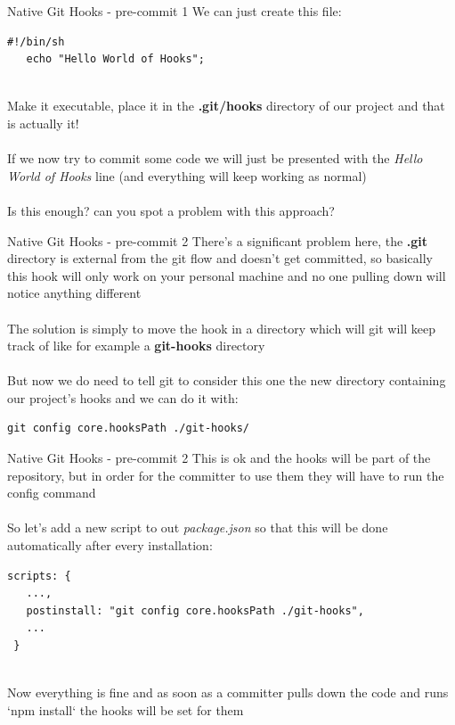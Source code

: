 \documentclass[11pt]{beamer}
\begin{document}
\begin{frame}[fragile]{Native Git Hooks - pre-commit 1}
  We can just create this file:
    \begin{lstlisting}[frame=single,columns=fullflexible]
   #!/bin/sh
   echo "Hello World of Hooks";
   \end{lstlisting}
  ~\\
  Make it executable, place it in the \textbf{.git/hooks} directory of our project and that is actually it!
  \\~\\
  If we now try to commit some code we will just be presented with the \textit{Hello World of Hooks} line (and everything will keep working as normal)
  \\~\\
  Is this enough? can you spot a problem with this approach?
\end{frame}


\begin{frame}[fragile]{Native Git Hooks - pre-commit 2}
 There's a significant problem here, the \textbf{.git} directory is external from the git flow and doesn't get committed, so basically this hook will only work on your  personal machine and no one pulling down will notice anything different
 \\~\\
 The solution is simply to move the hook in a directory which will git will keep track of like for example a \textbf{git-hooks} directory
 \\~\\
 But now we do need to tell git to consider this one the new directory containing our project's hooks and we can do it with:
 \begin{lstlisting}[columns=fullflexible]
   git config core.hooksPath ./git-hooks/
 \end{lstlisting}
\end{frame}



\begin{frame}[fragile]{Native Git Hooks - pre-commit 2}
  This is ok and the hooks will be part of the repository, but in order for the committer to use them they will have to run the config command
  \\~\\
  So let's add a new script to out \textit{package.json} so that this will be done automatically after every installation:
  \begin{footnotesize}
    \begin{lstlisting}[frame=single,columns=fullflexible]
 scripts: {
   ...,
   postinstall: "git config core.hooksPath ./git-hooks",
   ...
 }
   \end{lstlisting}
  \end{footnotesize}
  ~\\
  Now everything is fine and as soon as a committer pulls down the code and runs `npm install` the hooks will be set for them 
\end{frame}
\end{document}
